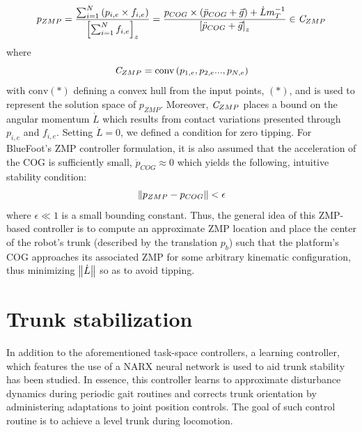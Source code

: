 			\begin{equation}
				p_{ZMP} 
				= 
				\frac{ \sum_{i=1}^{N} \left( p_{i,e} \times f_{i,e} \right) }{ \left[\sum_{i=1}^{N} f_{i,e}\right]_{z} }
				= 
				\frac{ 	p_{COG} \times \left( \ddot{p}_{COG} + \vec{g} \right) + \dot{L}m_{T}^{-1} }{ \left[ \ddot{p}_{COG} + \vec{g} \right]_{z}}
				\in \emph{C}_{ZMP} 
			\end{equation}
		where
			\begin{equation}
				\emph{C}_{ZMP} = \text{conv}\left(p_{1,e},p_{2,e}...,p_{N,e}\right)
			\end{equation}
		with $\text{conv}(*)$ defining a convex hull from the  input points, $(*)$, and is used to represent the solution space of $p_{ZMP}$. Moreover, $\emph{C}_{ZMP}$ places a bound on the angular momentum $\dot{L}$ which results from contact variations presented through $p_{i,e}$ and $f_{i,e}$. Setting $\dot{L}=0$, we defined a condition for zero tipping. For BlueFoot's ZMP controller formulation, it is also assumed that the acceleration of the COG is sufficiently small, \IE $\ddot{p}_{COG}\approx0$ which yields the following, intuitive stability condition:
			\begin{equation}
				\left\lVert p_{ZMP} - p_{COG}\right\rVert < \epsilon
			\end{equation}
		where $\epsilon\ll1$ is a small bounding constant. Thus, the general idea of this ZMP-based controller is to compute an approximate ZMP location and place the center of the robot's trunk (described by the translation $p_{b}$) such that the platform's COG approaches its associated ZMP for some arbitrary kinematic configuration, thus minimizing $\left\lVert\dot{L}\right\rVert$ so as to avoid tipping.


		\section{Trunk stabilization}

		In addition to the aforementioned task-space controllers, a learning controller, which features the use of a NARX neural network is used to aid trunk stability has been studied. In essence, this controller learns to approximate disturbance dynamics during periodic gait routines and corrects trunk orientation by administering adaptations to joint position controls. The goal of such control routine is to achieve a level trunk during locomotion.
			
